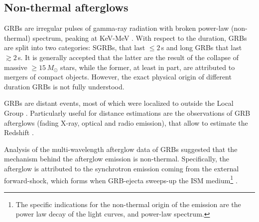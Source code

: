 \subsection{Non-thermal afterglows}\label{sec:intro:afterglow}

\acp{GRB} are irregular pulses of gamma-ray radiation with broken power-law 
(non-thermal) spectrum, peaking at KeV-MeV \citep{Band:1993,Kouveliotou:1993,Meegan:1992xg}.
%
With respect to the duration, \acp{GRB} are split into two categories: \acp{SGRB}, 
that last ${\leq}2\,$s and long \acp{GRB} that last ${\gtrsim}2\,$s. 
%
It is generally accepted that the latter are the 
result of the collapse of massive ${\geq}15\,M_{\odot}$ stars,
 while the former, at least in part, are attributed to mergers of compact objects. 
%
However, the exact physical origin of different duration 
\acp{GRB} is not fully understood.
%

\acp{GRB} are distant events, most of which were localized to outside the Local Group 
\citep[\eg][]{Mao:1992,Piran:1992,Fenimore:1993}. 
%
Particularly useful for distance estimations are the observations of \ac{GRB} afterglows 
(fading X-ray, optical and radio emission), 
that allow to estimate the Redshift \citep[\eg][]{Costa:1997cg,Frontera:1997ae}.

Analysis of the multi-wavelength afterglow data of \acp{GRB} 
\citep[\eg][]{Panaitescu:2001bx} suggested that the mechanism behind the afterglow 
emission is non-thermal. Specifically, the afterglow is attributed to the 
synchrotron emission coming from the external forward-shock, which forms 
when \ac{GRB}-ejecta sweeps-up the \ac{ISM} medium\footnote{
    The specific indications for the non-thermal origin of the emission 
    are the power law decay of the light curves, and power-law spectrum. 
} 
\citep{Rees:1992ek,Paczynski:1993gz,Meszaros:1993ju,Meszaros:1996sv}.
%

